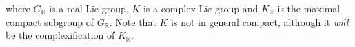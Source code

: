 \begin{remark}
\begin{center}
\end{center}
\noindent where $G_\mathbb{R}$ is a real Lie group, $K$ is a complex Lie group and $K_\mathbb{R}$ is the maximal compact subgroup of $G_\mathbb{R}$. Note that $K$ is not in general compact, although it {\em will} be the complexification of $K_\mathbb{R}$.\\
\end{remark}




